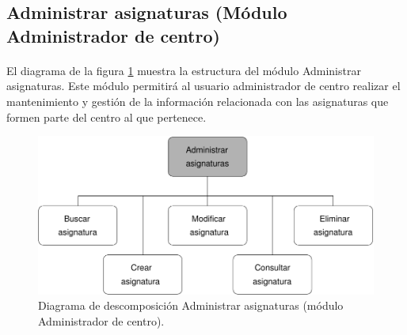 \subsection{Administrar asignaturas (Módulo Administrador de centro)}

  \paragraph{}El diagrama de la figura
  \ref{diagramaDescomposicionAdministrarAsignaturas-admCentro} muestra la
  estructura del módulo Administrar asignaturas. Este módulo permitirá al
  usuario administrador de centro realizar el mantenimiento y gestión de la
  información relacionada con las asignaturas que formen parte del centro al
  que pertenece.

  \begin{figure}[!ht]
    \begin{center}
      \includegraphics[]{11.Disenyo_Arquitectonico/11.2.Diagramas_Descomposicion/11.2.3.Modulo_administrador_centro/AdministrarBBDD/AdministrarAsignaturas/Diagramas/administrar_asignaturas.pdf}
      \caption{Diagrama de descomposición Administrar asignaturas (módulo Administrador de centro).}
      \label{diagramaDescomposicionAdministrarAsignaturas-admCentro}
    \end{center}
  \end{figure}
